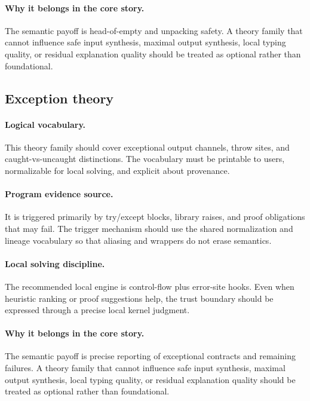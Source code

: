 \documentclass[11pt]{report}
\theoremstyle{definition}
\theoremstyle{plain}
\begin{document}
\paragraph{Why it belongs in the core story.}
The semantic payoff is head-of-empty and unpacking safety. A theory family that cannot influence safe
input synthesis, maximal output synthesis, local typing quality, or residual
explanation quality should be treated as optional rather than foundational.

\subsection{Exception theory}

\paragraph{Logical vocabulary.}
This theory family should cover exceptional output channels, throw sites, and caught-vs-uncaught distinctions. The vocabulary must be printable to
users, normalizable for local solving, and explicit about provenance.

\paragraph{Program evidence source.}
It is triggered primarily by try/except blocks, library raises, and proof obligations that may fail. The trigger mechanism should use the
shared normalization and lineage vocabulary so that aliasing and wrappers do
not erase semantics.

\paragraph{Local solving discipline.}
The recommended local engine is control-flow plus error-site hooks. Even when heuristic ranking or
proof suggestions help, the trust boundary should be expressed through a
precise local kernel judgment.

\paragraph{Why it belongs in the core story.}
The semantic payoff is precise reporting of exceptional contracts and remaining failures. A theory family that cannot influence safe
input synthesis, maximal output synthesis, local typing quality, or residual
explanation quality should be treated as optional rather than foundational.
\end{document}
